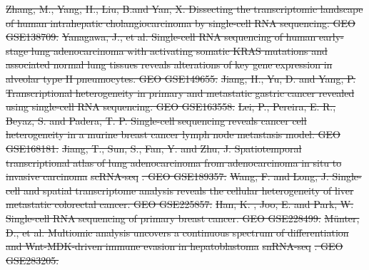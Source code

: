 \documentclass[referee, pdflatex, sn-vancouver-num]{sn-jnl}
\providecommand{\DIFdeltex}[1]{{\protect\color{red}\sout{#1}}}                      %
\providecommand{\DIFdel}[1]{\texorpdfstring{\DIFdeltex{#1}}{}} %
\begin{document}
\begin{appendices}
\DIFdel{Zhang, M., Yang, H., Liu, B.and Yan, X. Dissecting the transcriptomic landscape of human intrahepatic cholangiocarcinoma by single-cell RNA sequencing. GEO GSE138709. }%
\DIFdel{Yanagawa, J., et al. Single-cell RNA sequencing of human early-stage lung adenocarcinoma with activating somatic KRAS mutations and associated normal lung tissues reveals alterations of key gene expression in alveolar type II pneumocytes. GEO GSE149655. }%
\DIFdel{Jiang, H., Yu, D. and Yang, P. Transcriptional heterogeneity in primary and metastatic gastric cancer revealed using single-cell RNA sequencing. GEO GSE163558. }%
\DIFdel{Lei, P., Pereira, E. R., Beyaz, S. and Padera, T. P. Single-cell sequencing reveals cancer cell heterogeneity in a murine breast cancer lymph node metastasis model. GEO GSE168181. }%
\DIFdel{Jiang, T., Sun, S., Fan, Y. and Zhu, J. Spatiotemporal transcriptional atlas of lung adenocarcinoma from adenocarcinoma in situ to invasive carcinoma }%
\DIFdel{scRNA-seq}%
\DIFdel{. GEO GSE189357. }%
\DIFdel{Wang, F. and Long, J. Single-cell and spatial transcriptome analysis reveals the cellular heterogeneity of liver metastatic colorectal cancer. GEO GSE225857. }%
\DIFdel{Han, K. , Joo, E. and Park, W. Single-cell RNA sequencing of primary breast cancer. GEO GSE228499. }%
\DIFdel{M\"{u}nter, D., et al. Multiomic analysis uncovers a continuous spectrum of differentiation and Wnt-MDK-driven immune evasion in hepatoblastoma }%
\DIFdel{snRNA-seq}%
\DIFdel{. GEO GSE283205. }%

\end{appendices}
\end{document}
